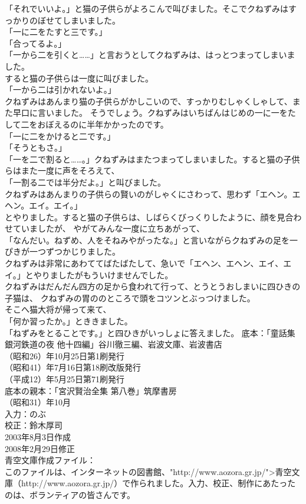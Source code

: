 \documentclass[
a4paper,
10pt,
book]
{tarticle}
\begin{document}
\newpage
\thispagestyle{fancy}
\fancyhead[R]{\empty}
「それでいいよ。」と猫の子供らがよろこんで叫びました。そこでクねずみはすっかりのぼせてしまいました。\\
「一に二をたすと三です。」\\
「合ってるよ。」\\
「一から二を引くと……」と言おうとしてクねずみは、はっとつまってしまいました。\\
\indent すると猫の子供らは一度に叫びました。\\
「一から二は引かれないよ。」\\
\indent クねずみはあんまり猫の子供らがかしこいので、すっかりむしゃくしゃして、また早口に言いました。
そうでしょう。クねずみはいちばんはじめの一に一をたして二をおぼえるのに半年かかったのです。\\
「一に二をかけると二です。」\\
「そうともさ。」\\
「一を二で割ると……。」クねずみはまたつまってしまいました。すると猫の子供らはまた一度に声をそろえて、\\
「一割る二では半分だよ。」と叫びました。\\
\indent クねずみはあんまりの子供らの賢いのがしゃくにさわって、思わず「エヘン。エヘン。エイ。エイ。」\\
とやりました。すると猫の子供らは、しばらくびっくりしたように、顔を見合わせていましたが、
\newpage
\thispagestyle{fancy}
\fancyhead[R]{\empty}
やがてみんな一度に立ちあがって、\\
「なんだい。ねずめ、人をそねみやがったな。」と言いながらクねずみの足を一ぴきが一つずつかじりました。\\
\indent クねずみは非常にあわててばたばたして、急いで「エヘン、エヘン、エイ、エイ。」とやりましたがもういけませんでした。\\
\indent クねずみはだんだん四方の足から食われて行って、とうとうおしまいに四ひきの子猫は、
クねずみの胃ののところで頭をコツンとぶっつけました。\\
\indent そこへ猫大将が帰って来て、\\
「何か習ったか。」とききました。\\
「ねずみをとることです。」と四ひきがいっしょに答えました。
\newpage
\nolinenumbers
底本：「童話集 銀河鉄道の夜 他十四編」谷川徹三編、岩波文庫、岩波書店
\\
（昭和26）年10月25日第1刷発行\\
（昭和41）年7月16日第18刷改版発行\\
（平成12）年5月25日第71刷発行\\
底本の親本：「宮沢賢治全集 第八巻」筑摩書房\\
（昭和31）年10月\\
入力：のぶ\\
校正：鈴木厚司\\
2003年8月3日作成\\
2008年2月29日修正\\
青空文庫作成ファイル：\\
このファイルは、インターネットの図書館、"http://www.aozora.gr.jp/">青空文庫（http://www.aozora.gr.jp/）で作られました。入力、校正、制作にあたったのは、ボランティアの皆さんです。\\
\\
\begin{comment}
\end{comment}
\end{document}
